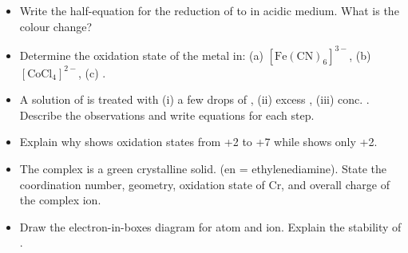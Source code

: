 \documentclass[11pt]{article}
\begin{document}
\begin{exercice}
\begin{itemize}
\item Write the half-equation for the reduction of  to  in acidic medium. What is the colour change?
\item Determine the oxidation state of the metal in: (a) \ensuremath{\mathrm{[Fe(CN)_{6}]^{3-}}}, (b) \ensuremath{\mathrm{[CoCl_{4}]^{2-}}}, (c) .
\item A solution of  is treated with (i) a few drops of , (ii) excess , (iii) conc. . Describe the observations and write equations for each step.
\item Explain why  shows oxidation states from +2 to +7 while  shows only +2.
\item The complex  is a green crystalline solid. (en = ethylenediamine). State the coordination number, geometry, oxidation state of Cr, and overall charge of the complex ion.
\item Draw the electron-in-boxes diagram for  atom and  ion. Explain the stability of .
\end{itemize}
\end{exercice}
\end{document}

